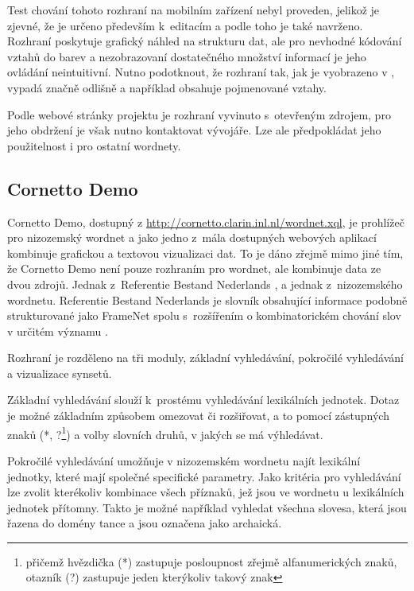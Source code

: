 \documentclass[a4paper, 11pt, oneside, showtrims]{book}
\newcommand\ex{\textsf}
\begin{document}
					Test chování tohoto rozhraní na mobilním zařízení nebyl proveden, jelikož je zjevné, že je určeno především k~editacím a podle toho je také navrženo. Rozhraní poskytuje grafický náhled na strukturu dat, ale pro nevhodné kódování vztahů do barev a nezobrazovaní dostatečného množství informací je jeho ovládání neintuitivní. Nutno podotknout, že rozhraní tak, jak je vyobrazeno v \textcite{szymanski2007cooperative}, vypadá značně odlišně a například obsahuje pojmenované vztahy.

					Podle webové stránky projektu \textcite{wordnetsolution2007web} je rozhraní vyvinuto s~otevřeným zdrojem, pro jeho obdržení je však nutno kontaktovat vývojáře. Lze ale předpokládat jeho použitelnost i pro ostatní wordnety.

				\subsection{Cornetto Demo}
				\label{wnvis:cornetto}

					Cornetto Demo, dostupný z \url{http://cornetto.clarin.inl.nl/wordnet.xql}, je prohlížeč pro nizozemský wordnet a jako jedno z~mála dostupných webových aplikací kombinuje grafickou a textovou vizualizaci dat. To je dáno zřejmě mimo jiné tím, že Cornetto Demo není pouze rozhraním pro wordnet, ale kombinuje data ze dvou zdrojů. Jednak z~Referentie Bestand Nederlands \parencite{martin2005referentie}, a jednak z~nizozemského wordnetu. Referentie Bestand Nederlands je slovník obsahující informace podobně strukturované jako FrameNet \parencite{fillmore2004framenet} spolu s~rozšířením o kombinatorickém chování slov v určitém významu \parencite{horak2008development}. 

					Rozhraní je rozděleno na tři moduly, základní vyhledávání, pokročilé vyhledávání a vizualizace synsetů. 

					Základní vyhledávání slouží k~prostému vyhledávání lexikálních jednotek. Dotaz je možné základním způsobem omezovat či rozšiřovat, a to pomocí zástupných znaků (\ex{*}, \ex{?}\footnote{přičemž hvězdička (\ex{*}) zastupuje posloupnost zřejmě alfanumerických znaků, otazník (\ex{?}) zastupuje jeden kterýkoliv takový znak}) a volby slovních druhů, v jakých se má výhledávat. \parencite{cornettoGettingStarted}

					Pokročilé vyhledávání umožňuje v nizozemském wordnetu najít lexikální jednotky, které mají společné specifické parametry. Jako kritéria pro vyhledávání lze zvolit kterékoliv kombinace všech příznaků, jež jsou ve wordnetu u lexikálních jednotek přítomny. Takto je možné například vyhledat všechna slovesa, která jsou řazena do domény tance a jsou označena jako archaická.  
\end{document}
